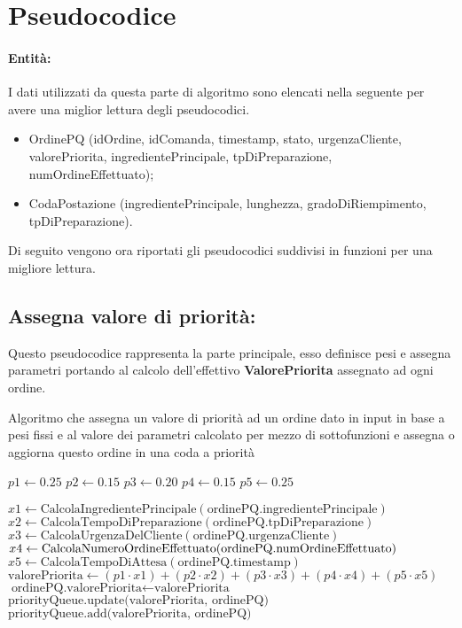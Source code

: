 \section{Pseudocodice}

\paragraph{Entità:}
I dati utilizzati da questa parte di algoritmo sono elencati nella seguente per avere una miglior lettura degli pseudocodici.
\begin{itemize}
	\item OrdinePQ (idOrdine, idComanda, timestamp, stato, urgenzaCliente, valorePriorita, ingredientePrincipale, tpDiPreparazione, numOrdineEffettuato);
	\item CodaPostazione (ingredientePrincipale, lunghezza, gradoDiRiempimento, tpDiPreparazione).
\end{itemize}

Di seguito vengono ora riportati gli pseudocodici suddivisi in funzioni per una migliore lettura.

\subsection{Assegna valore di priorità:}
Questo pseudocodice rappresenta la parte principale, esso definisce pesi e assegna parametri portando al calcolo dell'effettivo \textbf{ValorePriorita} assegnato ad ogni ordine.
\begin{algorithm}[h]
	\begin{algorithmic}[h!]
		\caption{Algoritmo che assegna un valore di priorità ad un ordine dato in input in base a pesi fissi e al valore dei parametri calcolato per mezzo di sottofunzioni e assegna o aggiorna questo ordine in una coda a priorità}
		\medskip

		\State $p1 \gets 0.25$
		\State $p2 \gets 0.15$
		\State $p3 \gets 0.20$
		\State $p4 \gets 0.15$
		\State $p5 \gets 0.25$
		\medskip

		\State $x1 \gets \text{CalcolaIngredientePrincipale}(\text{ordinePQ.ingredientePrincipale})$
		\State $x2 \gets \text{CalcolaTempoDiPreparazione}(\text{ordinePQ.tpDiPreparazione})$
		\State $x3 \gets \text{CalcolaUrgenzaDelCliente}(\text{ordinePQ.urgenzaCliente})$
		\State $x4 \gets \text{CalcolaNumeroOrdineEffettuato(\text{ordinePQ.numOrdineEffettuato})}$
		\State $x5 \gets \text{CalcolaTempoDiAttesa}(\text{ordinePQ.timestamp})$
		\medskip
		\State $\text{valorePriorita} \gets (p1 \cdot x1) + (p2 \cdot x2) + (p3 \cdot x3) + (p4 \cdot x4) + (p5 \cdot x5)$
		\State $\text{ordinePQ.valorePriorita} \gets \text{valorePriorita}$
		\medskip
		\State $\text{priorityQueue.update(valorePriorita, ordinePQ)}$
		\Else
		\State $\text{priorityQueue.add(valorePriorita, ordinePQ)}$
		\EndIf
		\EndProcedure
	\end{algorithmic}
\end{algorithm}

